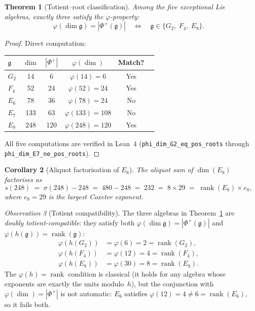 \documentclass[11pt]{amsart}
\theoremstyle{plain}
\newtheorem{theorem}{Theorem}[section]
\newtheorem{corollary}[theorem]{Corollary}
\theoremstyle{definition}
\theoremstyle{remark}
\newtheorem{observation}[theorem]{Observation}
\newcommand{\fg}{\mathfrak{g}}
\renewcommand{\Phi}{\varPhi}
\newcommand{\rank}{\operatorname{rank}}
\begin{document}
\begin{theorem}[Totient--root classification]\label{thm:totient-roots}
Among the five exceptional Lie algebras, exactly three satisfy the
$\varphi$-property:
\[
  \varphi(\dim\fg) = |\Phi^+(\fg)|
  \quad\Longleftrightarrow\quad
  \fg \in \{G_2,\; F_4,\; E_8\}.
\]
\end{theorem}

\begin{proof}
Direct computation:
\begin{center}
\begin{tabular}{@{}lccccl@{}}
\toprule
$\fg$ & $\dim$ & $|\Phi^+|$ & $\varphi(\dim)$ & Match? \\
\midrule
$G_2$  & 14  & 6   & $\varphi(14)=6$   & Yes \\
$F_4$  & 52  & 24  & $\varphi(52)=24$  & Yes \\
$E_6$  & 78  & 36  & $\varphi(78)=24$  & No  \\
$E_7$  & 133 & 63  & $\varphi(133)=108$ & No  \\
$E_8$  & 248 & 120 & $\varphi(248)=120$ & Yes \\
\bottomrule
\end{tabular}
\end{center}
All five computations are verified in Lean~4
(\texttt{phi\_dim\_G2\_eq\_pos\_roots} through
\texttt{phi\_dim\_E7\_ne\_pos\_roots}).
\end{proof}

\begin{corollary}[Aliquot factorisation of $E_8$]\label{cor:aliquot-E8}
The aliquot sum of $\dim(E_8)$ factorises as
\[
  s(248) \;=\; \sigma(248) - 248 \;=\; 480 - 248 \;=\; 232
  \;=\; 8 \times 29 \;=\; \rank(E_8) \times e_8,
\]
where $e_8 = 29$ is the largest Coxeter exponent.
\end{corollary}

\begin{observation}[Totient compatibility]\label{obs:totient-compat}
The three algebras in Theorem~\ref{thm:totient-roots} are
\emph{doubly totient-compatible}: they satisfy both
$\varphi(\dim\fg) = |\Phi^+(\fg)|$ and $\varphi(h(\fg)) = \rank(\fg)$:
\begin{align*}
  \varphi(h(G_2)) &= \varphi(6)  = 2 = \rank(G_2), \\
  \varphi(h(F_4)) &= \varphi(12) = 4 = \rank(F_4), \\
  \varphi(h(E_8)) &= \varphi(30) = 8 = \rank(E_8).
\end{align*}
The $\varphi(h) = \rank$ condition is classical (it holds for any
algebra whose exponents are exactly the units modulo~$h$), but the
conjunction with $\varphi(\dim) = |\Phi^+|$ is not automatic: $E_6$
satisfies $\varphi(12) = 4 \ne 6 = \rank(E_6)$, so it fails both.
\end{observation}
\end{document}

